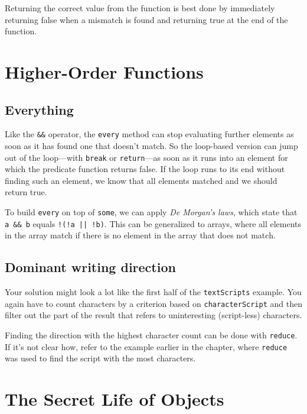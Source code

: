 Returning the correct value from the function is best done by immediately returning false when a mismatch is found and returning true at the end of the function.

\section{Higher-Order Functions}

\subsection{Everything}

Like the \lstinline`&&` operator, the \lstinline`every` method can stop evaluating further elements as soon as it has found one that doesn't match. So the loop-based version can jump out of the loop—with \lstinline`break` or \lstinline`return`—as soon as it runs into an element for which the predicate function returns false. If the loop runs to its end without finding such an element, we know that all elements matched and we should return true.

To build \lstinline`every` on top of \lstinline`some`, we can apply \emph{De Morgan's
laws}, which state that \lstinline`a && b` equals \lstinline`!(!a || !b)`. This can be generalized to arrays, where all elements in the array match if there is no element in the array that does not match.

\subsection{Dominant writing direction}

Your solution might look a lot like the first half of the \lstinline`textScripts` example. You again have to count characters by a criterion based on \lstinline`characterScript` and then filter out the part of the result that refers to uninteresting (script-less) characters.

Finding the direction with the highest character count can be done with \lstinline`reduce`. If it's not clear how, refer to the example earlier in the chapter, where \lstinline`reduce` was used to find the script with the most characters.

\section{The Secret Life of Objects}

